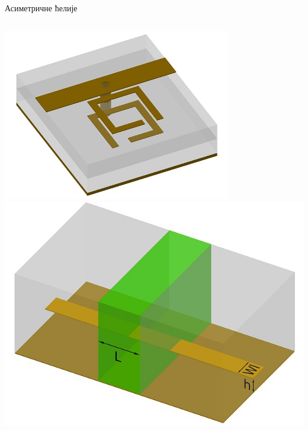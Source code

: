 \documentclass{beamer}
\begin{document}
\begin{frame}[t]{Асиметричне ћелије}
\begin{columns}[c]
        \includegraphics[width=0.75\textwidth]{slike/p2.jpeg}
        \includegraphics[width=0.8\columnwidth]{slike/slab.jpeg}

    \end{columns}
\end{frame}
\end{document}
